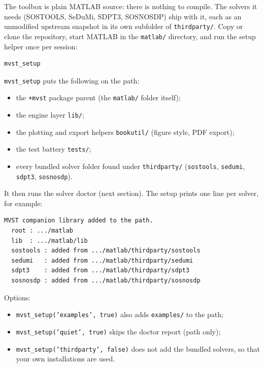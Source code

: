 \documentclass[11pt,oneside]{report}
\newcommand{\code}[1]{\texttt{#1}}
\providecommand{\tightlist}{\setlength{\itemsep}{0pt}\setlength{\parskip}{0pt}}
\begin{document}
The toolbox is plain MATLAB source: there is nothing to compile. The solvers it
needs (SOSTOOLS, SeDuMi, SDPT3, SOSNOSDP) ship with it, each as an
unmodified upstream snapshot in its own subfolder of \code{thirdparty/}. Copy or
clone the repository, start MATLAB in the \code{matlab/} directory, and run the
setup helper once per session:

\begin{lstlisting}[style=matlabstyle]
mvst_setup
\end{lstlisting}

\code{mvst\_setup} puts the following on the path:

\begin{itemize}
\tightlist
\item
  the \code{+mvst} package parent (the \code{matlab/} folder itself);
\item
  the engine layer \code{lib/};
\item
  the plotting and export helpers \code{bookutil/} (figure style, PDF export);
\item
  the test battery \code{tests/};
\item
  every bundled solver folder found under \code{thirdparty/}
  (\code{sostools}, \code{sedumi}, \code{sdpt3}, \code{sosnosdp}).
\end{itemize}

It then runs the solver doctor (next section). The setup prints one line per
solver, for example:

\begin{lstlisting}[style=outputstyle]
MVST companion library added to the path.
  root : .../matlab
  lib  : .../matlab/lib
  sostools : added from .../matlab/thirdparty/sostools
  sedumi   : added from .../matlab/thirdparty/sedumi
  sdpt3    : added from .../matlab/thirdparty/sdpt3
  sosnosdp : added from .../matlab/thirdparty/sosnosdp
\end{lstlisting}

Options:

\begin{itemize}
\tightlist
\item
  \code{mvst\_setup('examples', true)} also adds \code{examples/} to the path;
\item
  \code{mvst\_setup('quiet', true)} skips the doctor report (path only);
\item
  \code{mvst\_setup('thirdparty', false)} does not add the bundled solvers, so that
  your own installations are used.
\end{itemize}
\end{document}
